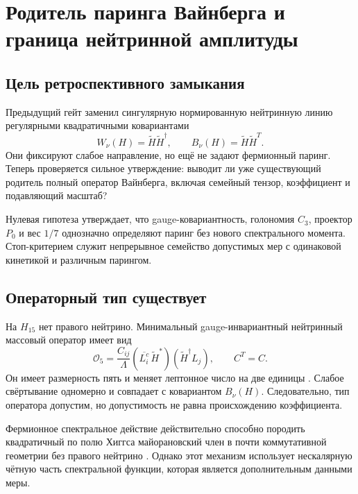 \chapter{Родитель паринга Вайнберга и граница нейтринной амплитуды}
\label{ch:v6-spectral-transition-weinberg-pairing-parent-gate}

\section{Цель ретроспективного замыкания}

Предыдущий гейт заменил сингулярную нормированную нейтринную линию
регулярными квадратичными ковариантами
\begin{equation}
 W_\nu(H)=\widetilde H\widetilde H^\dagger,
 \qquad
 B_\nu(H)=\widetilde H\widetilde H^T.
\end{equation}
Они фиксируют слабое направление, но ещё не задают фермионный паринг.
Теперь проверяется сильное утверждение: выводит ли уже существующий
родитель полный оператор Вайнберга, включая семейный тензор,
коэффициент и подавляющий масштаб?

Нулевая гипотеза утверждает, что gauge-ковариантность, голономия $C_3$,
проектор $P_0$ и вес $1/7$ однозначно определяют паринг без нового
спектрального момента. Стоп-критерием служит непрерывное семейство
допустимых мер с одинаковой кинетикой и различным парингом.

\section{Операторный тип существует}

На $H_{15}$ нет правого нейтрино. Минимальный gauge-инвариантный
нейтринный массовый оператор имеет вид
\begin{equation}
 \mathcal O_5=
 \frac{C_{ij}}{\Lambda}
 (\overline{L_i^c}\,\widetilde H^*)
 (\widetilde H^\dagger L_j),
 \qquad C^T=C.
 \label{eq:v6-weinberg-pairing}
\end{equation}
Он имеет размерность пять и меняет лептонное число на две единицы
\cite{weinberg-parent-weinberg1979}. Слабое свёртывание одномерно и
совпадает с ковариантом $B_\nu(H)$. Следовательно, тип оператора
допустим, но допустимость не равна происхождению коэффициента.

Фермионное спектральное действие действительно способно породить
квадратичный по полю Хиггса майорановский член в почти коммутативной
геометрии без правого нейтрино
\cite{weinberg-parent-sakellariadou-sitarz2019}.
Однако этот механизм использует нескалярную чётную часть спектральной
функции, которая является дополнительным данными меры.

